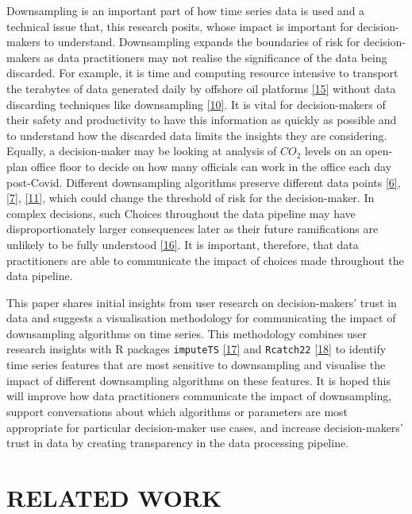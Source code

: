\documentclass{article}
\begin{document}
Downsampling is an important part of how time series data is used and a
technical issue that, this research posits, whose impact is important
for decision-makers to understand. Downsampling expands the boundaries
of risk for decision-makers as data practitioners may not realise the
significance of the data being discarded. For example, it is time and
computing resource intensive to transport the terabytes of data
generated daily by offshore oil platforms
\protect\hyperlink{ref-CISCO}{{[}15{]}} without data discarding
techniques like downsampling \protect\hyperlink{ref-TVStore}{{[}10{]}}.
It is vital for decision-makers of their safety and productivity to have
this information as quickly as possible and to understand how the
discarded data limits the insights they are considering. Equally, a
decision-maker may be looking at analysis of \(CO_2\) levels on an
open-plan office floor to decide on how many officials can work in the
office each day post-Covid. Different downsampling algorithms preserve
different data points \protect\hyperlink{ref-datapoint}{{[}6{]}},
\protect\hyperlink{ref-MinMaxLTTB}{{[}7{]}},
\protect\hyperlink{ref-Sveinn}{{[}11{]}}, which could change the
threshold of risk for the decision-maker. In complex decisions, such
Choices throughout the data pipeline may have disproportionately larger
consequences later as their future ramifications are unlikely to be
fully understood \protect\hyperlink{ref-challenger}{{[}16{]}}. It is
important, therefore, that data practitioners are able to communicate
the impact of choices made throughout the data pipeline.

This paper shares initial insights from user research on
decision-makers' trust in data and suggests a visualisation methodology
for communicating the impact of downsampling algorithms on time series.
This methodology combines user research insights with R packages
\texttt{imputeTS} \protect\hyperlink{ref-imputeTS_R}{{[}17{]}} and
\texttt{Rcatch22} \protect\hyperlink{ref-catch22_R}{{[}18{]}} to
identify time series features that are most sensitive to downsampling
and visualise the impact of different downsampling algorithms on these
features. It is hoped this will improve how data practitioners
communicate the impact of downsampling, support conversations about
which algorithms or parameters are most appropriate for particular
decision-maker use cases, and increase decision-makers' trust in data by
creating transparency in the data processing pipeline.

\hypertarget{related-work}{%
\section{RELATED WORK}\label{related-work}}
\end{document}
